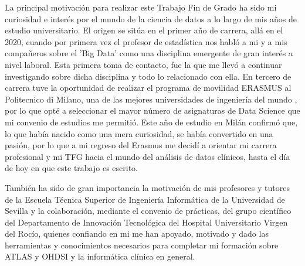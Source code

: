 
La principal motivación para realizar este Trabajo Fin de Grado ha sido mi curiosidad e interés por el mundo de la ciencia de datos a lo largo de mis años de estudio universitario. El origen se sitúa en el primer año de carrera, allá en el 2020, cuando por primera vez el profesor de estadística nos habló a mi y a mis compañeros sobre el 'Big Data' como una disciplina emergente de gran interés a nivel laboral. Esta primera toma de contacto, fue la que me llevó a continuar investigando sobre dicha disciplina y todo lo relacionado con ella. En tercero de carrera tuve la oportunidad de realizar el programa de movilidad ERASMUS al Politecnico di Milano, una de las mejores universidades de ingeniería del mundo \cite{QSPolimi}, por lo que opté a seleccionar el mayor número de asignaturas de Data Science que mi convenio de estudios me permitió. Este año de estudio en Milán confirmó que, lo que había nacido como una mera curiosidad, se había convertido en una pasión, por lo que a mi regreso del Erasmus me decidí a orientar mi carrera profesional y mi TFG hacia el mundo del análisis de datos clínicos, hasta el día de hoy en que este trabajo es escrito.

También ha sido de gran importancia la motivación de mis profesores y tutores de la Escuela Técnica Superior de Ingeniería Informática de la Universidad de Sevilla y la colaboración, mediante el convenio de prácticas, del grupo científico del Departamento de Innovación Tecnológica del Hospital Universitario Virgen del Rocío, quienes confiando en mi me han apoyado, motivado y dado las herramientas y conocimientos necesarios para completar mi formación sobre ATLAS y OHDSI y la informática clínica en general.
